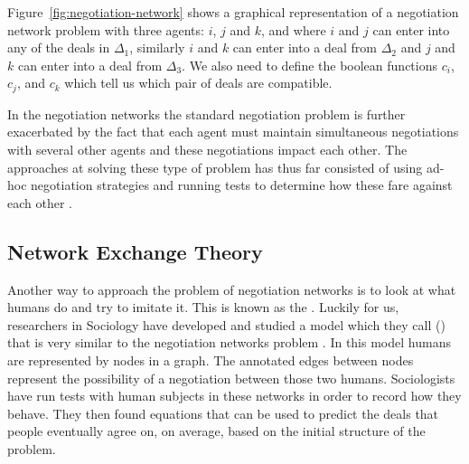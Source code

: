 \begin{SCfigure}
  \begin{minipage}{1.0\linewidth}
    \begin{center}
    \end{center}
  \end{minipage}
  \caption{Graphical representation of a negotiation network with
    agents $i$, $j$, and $k$, where $\Delta_1$ is a set of deals
    that $i$ and $j$ can agree upon. }
  \label{fig:negotiation-network}
\end{SCfigure}

Figure~\ref{fig:negotiation-network} shows a graphical representation
of a negotiation network problem with three agents: $i$, $j$ and $k$,
and where $i$ and $j$ can enter into any of the deals in $\Delta_1$,
similarly $i$ and $k$ can enter into a deal from $\Delta_2$ and $j$
and $k$ can enter into a deal from $\Delta_3$. We also need to define
the boolean functions $c_i$, $c_j$, and $c_k$ which tell us which pair
of deals are compatible.

In the negotiation networks the standard negotiation problem is
further exacerbated by the fact that each agent must maintain
simultaneous negotiations with several other agents and these
negotiations impact each other. The approaches at solving these type
of problem has thus far consisted of using ad-hoc negotiation
strategies and running tests to determine how these fare against each
other \cite{nguyen04a,zhang05a,zhang05b}.


\subsection{Network Exchange Theory}
\label{sec:net}

Another way to approach the problem of negotiation networks is to look
at what humans do and try to imitate it. This is known as the
. Luckily for us, researchers in Sociology
have developed and studied a model which they call  () that is very similar to the
negotiation networks problem \cite{willer99b}. In this model humans
are represented by nodes in a graph. The annotated edges between nodes
represent the possibility of a negotiation between those two humans.
Sociologists have run tests with human subjects in these networks in
order to record how they behave. They then found equations that can be
used to predict the deals that people eventually agree on, on average,
based on the initial structure of the problem.

